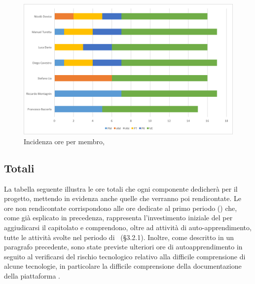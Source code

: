 \begin{figure}[H]
	\centering 
	\includegraphics[scale=0.7]{Immagini/GraficiPianoLavoro/VV.png}
	\caption{Incidenza ore per membro, \VV}
\end{figure}

\newpage
\subsection{Totali}
La tabella seguente illustra le ore totali che ogni componente dedicherà per il progetto, mettendo in evidenza anche quelle che verranno poi rendicontate. Le ore non rendicontate corrispondono alle ore dedicate al primo periodo (\ARM) che, come già esplicato in precedenza, rappresenta l'investimento iniziale del  per aggiudicarsi il capitolato e comprendono, oltre ad attività di auto-apprendimento, tutte le attività svolte nel periodo di \ARM\ (§3.2.1). Inoltre, come descritto in un paragrafo precedente, sono state previste ulteriori ore di autoapprendimento in seguito al verificarsi del rischio tecnologico relativo alla difficile comprensione di alcune tecnologie, in particolare la difficile comprensione della documentazione della piattaforma .

